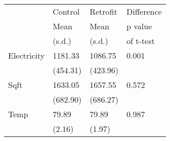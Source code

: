 \begin{tabular}{llll}
\toprule
{} &   Control &  Retrofit & Difference \\
{} &      Mean &      Mean &    p value \\
{} &    (s.d.) &    (s.d.) &  of t-test \\
\midrule
Electricity &   1181.33 &   1086.75 &      0.001 \\
            &  (454.31) &  (423.96) &            \\
Sqft        &   1633.05 &   1657.55 &      0.572 \\
            &  (682.90) &  (686.27) &            \\
Temp        &     79.89 &     79.89 &      0.987 \\
            &    (2.16) &    (1.97) &            \\
\bottomrule
\end{tabular}
